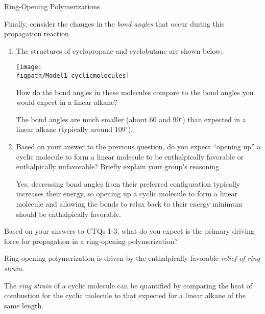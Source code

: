 \begin{activity}{Ring-Opening Polymerizations}
\begin{ctqs}
\begin{enumerate}
		\end{enumerate}
		
	\question Finally, consider the changes in the \emph{bond angles} that occur during this propagation reaction.
	
		\begin{enumerate}
		
			\item The structures of cyclopropane and cyclobutane are shown below:
			
				\centerline{\texttt{[image: \\figpath/Model1\_cyclicmolecules]}}
				
				How do the bond angles in these molecules compare to the bond angles you would expect in a linear alkane?
			
				\begin{solution}[1in]
					The bond angles are much smaller (about 60 and 90$^\circ$) than expected in a linear alkane (typically around 109$^\circ$).
				\end{solution}
				
			\item Based on your answer to the previous question, do you expect ``opening up'' a cyclic molecule to form a linear molecule to be enthalpically favorable or enthalpically unfavorable?  Briefly explain your group's reasoning.
			
				\begin{solution}[1in]
					Yes, decreasing bond angles from their preferred configuration typically increases their energy, so opening up a cyclic molecule to form a linear molecule and allowing the bonds to relax back to their energy minimum should be enthalpically favorable.
				\end{solution}
			
		\end{enumerate}
		
	\question Based on your answers to CTQs 1-3, what do you expect is the primary driving force for propagation in a ring-opening polymerization?
			
				\begin{solution}[0.75in]
					Ring-opening polymerization is driven by the enthalpically-favorable \emph{relief of ring strain}.
				\end{solution}

\end{ctqs}

\begin{infobox}

	The \emph{ring strain} of a cyclic molecule can be quantified by comparing the heat of combustion for the cyclic molecule to that expected for a linear alkane of the same length.
	

\end{infobox}
\end{activity}
